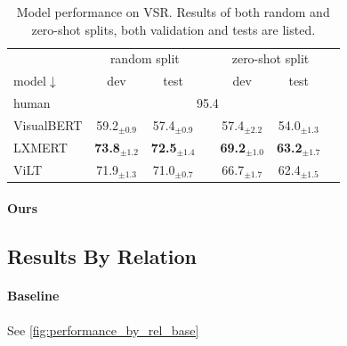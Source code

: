 \begin{table}[ht]
\centering
\small
\begin{tabular}{lcccccc}
\toprule
& \multicolumn{2}{c}{random split} &  & \multicolumn{2}{c}{zero-shot split} \\
\cmidrule(l){2-3} 	\cmidrule(l){4-6}
model$\downarrow$ & dev & test & & dev & test  \\
\midrule
human & \multicolumn{5}{c}{95.4}   \\
\midrule
VisualBERT & 59.2$_{\pm0.9}$ & 57.4$_{\pm0.9}$ & & 57.4$_{\pm2.2}$  & 54.0$_{\pm1.3}$  \\ 
LXMERT & \textbf{73.8}$_{\pm1.2}$  & \textbf{72.5}$_{\pm1.4}$ & & \textbf{69.2}$_{\pm1.0}$  & \textbf{63.2}$_{\pm1.7}$  \\ 
ViLT & 71.9$_{\pm1.3}$  & 71.0$_{\pm0.7}$  & & 66.7$_{\pm1.7}$  & 62.4$_{\pm1.5}$ \\ 
\bottomrule
\end{tabular}
\caption{Model performance on VSR. Results of both random and zero-shot splits, both validation and tests are listed.}
\label{tab:vsr_results_base}
\end{table}

\paragraph{Ours}

\subsection{Results By Relation}

\paragraph{Baseline}

See \cref{fig:performance_by_rel_base}

